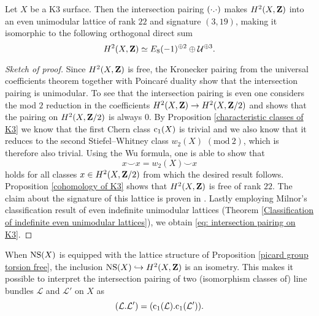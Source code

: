 \begin{proposition}
    \label{intersection pairing on K3 is even}
    Let $X$ be a K3 surface. Then the intersection pairing $(\cdot.\cdot)$ makes $H^{2}(X, \mathbf Z)$ into an even unimodular lattice of rank $22$ and signature $(3,19)$, making it isomorphic to the following orthogonal direct sum
    \begin{equation}
        \label{eq: intersection pairing on K3}
        H^{2}(X, \mathbf Z) \simeq E_8(-1)^{\oplus 2} \oplus \mathcal U^{\oplus 3}.
    \end{equation}
\end{proposition}

\begin{proof}[Sketch of proof]
    Since $H^{2}(X, \mathbf Z)$ is free, the Kronecker pairing from the universal coefficients theorem together with Poincaré duality show that the intersection pairing is unimodular. To see that the intersection pairing is even one considers the mod $2$ reduction in the coefficients $H^{2}(X, \mathbf Z) \to H^{2}(X, \mathbf Z/2)$ and shows that the pairing on $H^{2}(X, \mathbf Z/2)$ is always $0$. By Proposition \ref{characteristic classes of K3} we know that the first Chern class $\cclass[1](X)$ is trivial and we also know that it reduces to the second Stiefel--Whitney class $w_2(X)$ $\mathrm{(mod \ 2)}$, which is therefore also trivial. Using the Wu formula, one is able to show that
    \[
        x \smallsmile x = w_2(X) \smallsmile x
    \]
    holds for all classes $x \in H^{2}(X, \mathbf Z/2)$ from which the desired result follows. Proposition \ref{cohomology of K3} shows that $H^{2}(X, \mathbf Z)$ is free of rank $22$. The claim about the signature of this lattice is proven in \cite[\S 1, Proposition 3.5]{Huybrechts2016}. Lastly employing Milnor's classification result of even indefinite unimodular lattices (Theorem \ref{Classification of indefinite even unimodular lattices}), we obtain \eqref{eq: intersection pairing on K3}.
\end{proof}

\begin{remark}
    When $\operatorname{NS}(X)$ is equipped with the lattice structure of Proposition \ref{picard group torsion free}, the inclusion $\operatorname{NS}(X) \hookrightarrow H^{2}(X, \mathbf Z)$ is an isometry. This makes it possible to interpret the intersection pairing
    of two (isomorphism classes of) line bundles $\mathcal L$ and $\mathcal L'$ on $X$ as 
    \[
        \intersect{\mathcal L}{\mathcal L'} = \intersect{\cclass[1](\mathcal L)}{\cclass[1](\mathcal{L'})}.
    \]
\end{remark}

